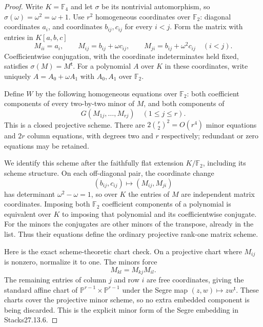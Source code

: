 \begin{proof}
Write $K=\mathbb F_4$ and let $\sigma$ be its nontrivial automorphism, so $\sigma(\omega)=\omega^2=\omega+1$. Use $r^2$ homogeneous coordinates over $\mathbb F_2$: diagonal coordinates $a_i$, and coordinates $b_{ij},c_{ij}$ for every $i<j$. Form the matrix with entries in $K[a,b,c]$
\[
 M_{ii}=a_i,\qquad
 M_{ij}=b_{ij}+\omega c_{ij},\qquad
 M_{ji}=b_{ij}+\omega^2 c_{ij}\quad(i<j).
\]
Coefficientwise conjugation, with the coordinate indeterminates held fixed, satisfies $\sigma(M)=M^{\mathsf t}$. For a polynomial $A$ over $K$ in these coordinates, write uniquely $A=A_0+\omega A_1$ with $A_0,A_1$ over $\mathbb F_2$.

Define $W$ by the following homogeneous equations over $\mathbb F_2$: both coefficient components of every two-by-two minor of $M$, and both components of
\[
                     G(M_{1j},\ldots,M_{rj})
                       \quad(1\leq j\leq r).
\]
This is a closed projective scheme. There are $2\binom r2^2=O(r^4)$ minor equations and $2r$ column equations, with degrees two and $r$ respectively; redundant or zero equations may be retained.

We identify this scheme after the faithfully flat extension $K/\mathbb F_2$, including its scheme structure. On each off-diagonal pair, the coordinate change
\[
        (b_{ij},c_{ij})\longmapsto(M_{ij},M_{ji})
\]
has determinant $\omega^2-\omega=1$, so over $K$ the entries of $M$ are independent matrix coordinates. Imposing both $\mathbb F_2$ coefficient components of a polynomial is equivalent over $K$ to imposing that polynomial and its coefficientwise conjugate. For the minors the conjugates are other minors of the transpose, already in the list. Thus their equations define the ordinary projective rank-one matrix scheme.

Here is the exact scheme-theoretic chart check. On a projective chart where $M_{ij}$ is nonzero, normalize it to one. The minors force
\[
                         M_{kl}=M_{kj}M_{il}.
\]
The remaining entries of column $j$ and row $i$ are free coordinates, giving the standard affine chart of
$\mathbb P^{r-1}\times\mathbb P^{r-1}$ under the Segre map $(z,w)\mapsto zw^{\mathsf t}$. These charts cover the projective minor scheme, so no extra embedded component is being discarded. This is the explicit minor form of the Segre embedding in Stacks27.13.6.


\end{proof}
